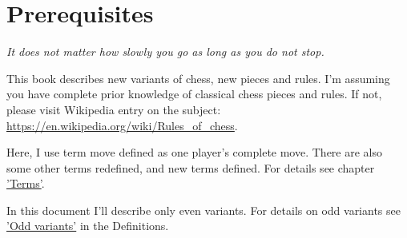 

\chapter*{Prerequisites}

\begin{flushright}
\parbox{0.7\textwidth}{
\emph{It does not matter how slowly you go as long as you do not stop. \\
 } }
\end{flushright}

\noindent
This book describes new variants of chess, new pieces and rules. I'm assuming you have complete prior
knowledge of classical chess pieces and rules. If not, please visit Wikipedia entry on the subject: \\
\href{https://en.wikipedia.org/wiki/Rules\_of\_chess}{https://en.wikipedia.org/wiki/Rules\_of\_chess}.

Here, I use term move defined as one player's complete move. There are also some other terms redefined,
and new terms defined. For details see chapter \hyperref[ch:Terms]{'Terms'}.

In this document I'll describe only even variants. For details on odd variants see
\hyperref[sec:Definitions/Odd variants]{'Odd variants'} in the Definitions.

\clearpage %
